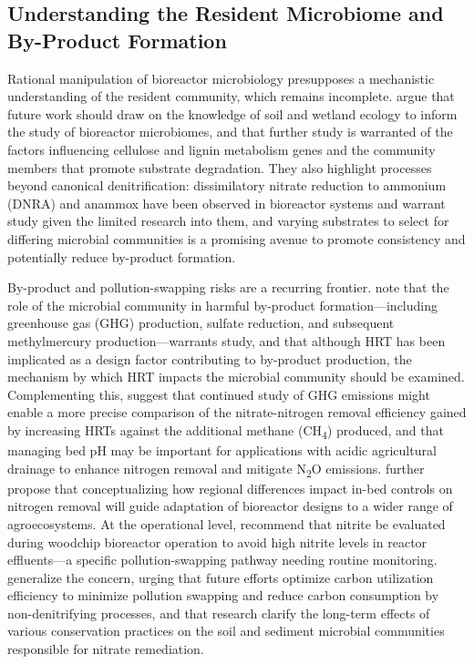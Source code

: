 \subsection{Understanding the Resident Microbiome and By-Product Formation}
Rational manipulation of bioreactor microbiology presupposes a mechanistic understanding of the resident community, which remains incomplete. \textcite{Hartfiel2022} argue that future work should draw on the knowledge of soil and wetland ecology to inform the study of bioreactor microbiomes, and that further study is warranted of the factors influencing cellulose and lignin metabolism genes and the community members that promote substrate degradation. They also highlight processes beyond canonical denitrification: dissimilatory nitrate reduction to ammonium (DNRA) and anammox have been observed in bioreactor systems and warrant study given the limited research into them, and varying substrates to select for differing microbial communities is a promising avenue to promote consistency and potentially reduce by-product formation.

By-product and pollution-swapping risks are a recurring frontier. \textcite{Hartfiel2022} note that the role of the microbial community in harmful by-product formation---including greenhouse gas (GHG) production, sulfate reduction, and subsequent methylmercury production---warrants study, and that although HRT has been implicated as a design factor contributing to by-product production, the mechanism by which HRT impacts the microbial community should be examined. Complementing this, \textcite{Bock2018} suggest that continued study of GHG emissions might enable a more precise comparison of the nitrate-nitrogen removal efficiency gained by increasing HRTs against the additional methane (CH\textsubscript{4}) produced, and that managing bed pH may be important for applications with acidic agricultural drainage to enhance nitrogen removal and mitigate N\textsubscript{2}O emissions. \textcite{Bock2018} further propose that conceptualizing how regional differences impact in-bed controls on nitrogen removal will guide adaptation of bioreactor designs to a wider range of agroecosystems. At the operational level, \textcite{Kouanda2021} recommend that nitrite be evaluated during woodchip bioreactor operation to avoid high nitrite levels in reactor effluents---a specific pollution-swapping pathway needing routine monitoring. \textcite{Wang2025b} generalize the concern, urging that future efforts optimize carbon utilization efficiency to minimize pollution swapping and reduce carbon consumption by non-denitrifying processes, and that research clarify the long-term effects of various conservation practices on the soil and sediment microbial communities responsible for nitrate remediation.

